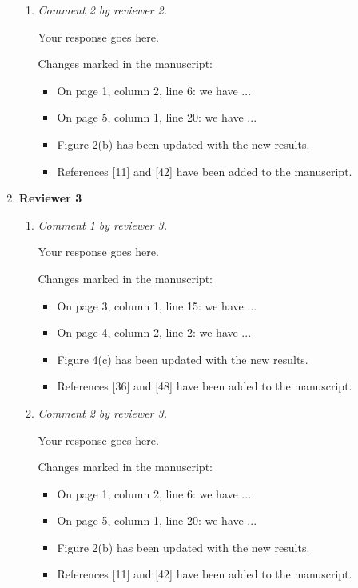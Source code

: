 \documentclass[12pt]{article}
\begin{document}
\begin{enumerate}
\begin{enumerate}
  \item \textit{Comment 2 by reviewer 2.}
    
    Your response goes here.
    
    Changes marked in the manuscript:
    
    \begin{itemize}
    \item On page 1, column 2, line 6: we have ...
    \item On page 5, column 1, line 20: we have ...
    \item Figure 2(b) has been updated with the new results.
    \item References [11] and [42] have been added to the manuscript.
    \end{itemize}
  \end{enumerate}
  
\item \textbf{Reviewer 3} %
  \begin{enumerate}
  \item \textit{Comment 1 by reviewer 3.}
    
    Your response goes here.

    Changes marked in the manuscript:

    \begin{itemize}
    \item On page 3, column 1, line 15: we have ...
    \item On page 4, column 2, line 2: we have ...
    \item Figure 4(c) has been updated with the new results.
    \item References [36] and [48] have been added to the manuscript.
    \end{itemize}

  \item \textit{Comment 2 by reviewer 3.}

    Your response goes here.

    Changes marked in the manuscript:

    \begin{itemize}
    \item On page 1, column 2, line 6: we have ...
    \item On page 5, column 1, line 20: we have ...
    \item Figure 2(b) has been updated with the new results.
    \item References [11] and [42] have been added to the manuscript.
    \end{itemize}
  \end{enumerate}
  
\end{enumerate}
\end{document}

